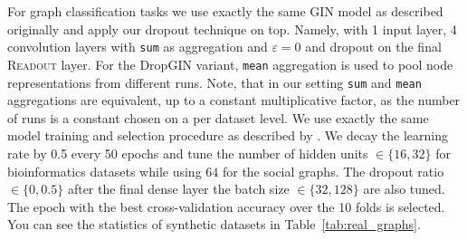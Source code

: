 \documentclass{article}
\begin{document}
\begin{table*}[ht]
\centering
{}
\caption{Synthetic dataset statistics and properties.}  
\label{tab:synthetic_graphs}
\end{table*} 

For graph classification tasks we use exactly the same GIN model as described originally and apply our dropout technique on top. Namely, with 1 input layer, 4 convolution layers with \texttt{sum} as aggregation and $\varepsilon=0$ and dropout \citep{srivastava2014dropout} on the final \textsc{Readout} layer. For the DropGIN variant, \texttt{mean} aggregation is used to pool node representations from different runs. Note, that in our setting \texttt{sum} and \texttt{mean} aggregations are equivalent, up to a constant multiplicative factor, as the number of runs is a constant chosen on a per dataset level. We use exactly the same model training and selection procedure as described by \citep{GIN}. We decay the learning rate by 0.5 every 50 epochs and tune the number of hidden units $\in \{16, 32\}$ for bioinformatics datasets while using $64$ for the social graphs. The dropout ratio $\in \{0,0.5\}$ after the final dense layer the batch size $\in \{32,128\}$ are also tuned. The epoch with the best cross-validation accuracy over the 10 folds is selected. You can see the statistics of synthetic datasets in Table~\ref{tab:real_graphs}. 
\end{document}
